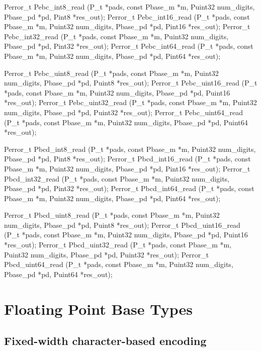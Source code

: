 \begin{tinycodeaux}{\leftmargin=0in}
\codeallowbreaks
Perror_t Pebc_int8_read   (P_t *pads, const Pbase_m *m, Puint32 num_digits,
			   Pbase_pd *pd, Pint8 *res_out);
Perror_t Pebc_int16_read  (P_t *pads, const Pbase_m *m, Puint32 num_digits,
			   Pbase_pd *pd, Pint16 *res_out);
Perror_t Pebc_int32_read  (P_t *pads, const Pbase_m *m, Puint32 num_digits,
			   Pbase_pd *pd, Pint32 *res_out);
Perror_t Pebc_int64_read  (P_t *pads, const Pbase_m *m, Puint32 num_digits,
			   Pbase_pd *pd, Pint64 *res_out);

Perror_t Pebc_uint8_read  (P_t *pads, const Pbase_m *m, Puint32 num_digits,
			   Pbase_pd *pd, Puint8 *res_out);
Perror_t Pebc_uint16_read (P_t *pads, const Pbase_m *m, Puint32 num_digits,
			   Pbase_pd *pd, Puint16 *res_out);
Perror_t Pebc_uint32_read (P_t *pads, const Pbase_m *m, Puint32 num_digits,
			   Pbase_pd *pd, Puint32 *res_out);
Perror_t Pebc_uint64_read (P_t *pads, const Pbase_m *m, Puint32 num_digits,
			   Pbase_pd *pd, Puint64 *res_out);

Perror_t Pbcd_int8_read   (P_t *pads, const Pbase_m *m, Puint32 num_digits,
			   Pbase_pd *pd, Pint8 *res_out);
Perror_t Pbcd_int16_read  (P_t *pads, const Pbase_m *m, Puint32 num_digits,
			   Pbase_pd *pd, Pint16 *res_out);
Perror_t Pbcd_int32_read  (P_t *pads, const Pbase_m *m, Puint32 num_digits,
			   Pbase_pd *pd, Pint32 *res_out);
Perror_t Pbcd_int64_read  (P_t *pads, const Pbase_m *m, Puint32 num_digits,
			   Pbase_pd *pd, Pint64 *res_out);

Perror_t Pbcd_uint8_read  (P_t *pads, const Pbase_m *m, Puint32 num_digits,
			   Pbase_pd *pd, Puint8 *res_out);
Perror_t Pbcd_uint16_read (P_t *pads, const Pbase_m *m, Puint32 num_digits,
			   Pbase_pd *pd, Puint16 *res_out);
Perror_t Pbcd_uint32_read (P_t *pads, const Pbase_m *m, Puint32 num_digits,
			   Pbase_pd *pd, Puint32 *res_out);
Perror_t Pbcd_uint64_read (P_t *pads, const Pbase_m *m, Puint32 num_digits,
			   Pbase_pd *pd, Puint64 *res_out);
\end{tinycodeaux}

\section{Floating Point Base Types}

\subsection{Fixed-width character-based encoding}

